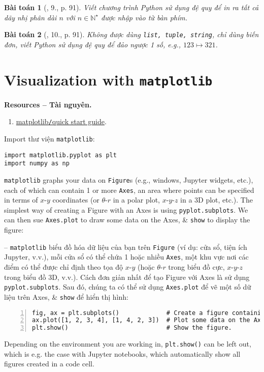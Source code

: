\documentclass{article}
\newtheorem{baitoan}{Bài toán}
\begin{document}
\begin{baitoan}[\cite{Que_BT_Python}, 9., p. 91]
    Viết chương trình Python sử dụng đệ quy để in ra tất cả dãy nhị phân dài $n$ với $n\in\mathbb{N}^\star$ được nhập vào từ bàn phím.
\end{baitoan}

\begin{baitoan}[\cite{Que_BT_Python}, 10., p. 91]
    Không được dùng {\tt list, tuple, string}, chỉ dùng biến đơn, viết Python sử dụng đệ quy để đảo ngược 1 số, e.g., $123\mapsto321$.
\end{baitoan}


\section{Visualization with {\tt matplotlib}}
\textbf{\textsf{Resources -- Tài nguyên.}}
\begin{enumerate}
    \item \href{https://matplotlib.org/stable/users/explain/quick_start.html#quick-start}{matplotlib{\tt/}quick start guide}.
\end{enumerate}
Import thư viện {\tt matplotlib}:
\begin{verbatim}
import matplotlib.pyplot as plt
import numpy as np
\end{verbatim}
{\tt matplotlib} graphs your data on {\tt Figure}s (e.g., windows, Jupyter widgets, etc.), each of which can contain 1 or more {\tt Axes}, an area where points can be specified in terms of $x$-$y$ coordinates (or $\theta$-$r$ in a polar plot, $x$-$y$-$z$ in a 3D plot, etc.). The simplest way of creating a Figure with an Axes is using {\tt pyplot.subplots}. We can then sue {\tt Axes.plot} to draw some data on the Axes, \& {\tt show} to display the figure:

-- {\tt matplotlib} biểu đồ hóa dữ liệu của bạn trên {\tt Figure} (ví dụ: cửa sổ, tiện ích Jupyter, v.v.), mỗi cửa sổ có thể chứa 1 hoặc nhiều {\tt Axes}, một khu vực nơi các điểm có thể được chỉ định theo tọa độ $x$-$y$ (hoặc $\theta$-$r$ trong biểu đồ cực, $x$-$y$-$z$ trong biểu đồ 3D, v.v.). Cách đơn giản nhất để tạo Figure với Axes là sử dụng {\tt pyplot.subplots}. Sau đó, chúng ta có thể sử dụng {\tt Axes.plot} để vẽ một số dữ liệu trên Axes, \& {\tt show} để hiển thị hình:
\begin{Verbatim}[numbers=left,xleftmargin=5mm]
fig, ax = plt.subplots()             # Create a figure containing a single Axes.
ax.plot([1, 2, 3, 4], [1, 4, 2, 3])  # Plot some data on the Axes.
plt.show()                           # Show the figure.
\end{Verbatim}
Depending on the environment you are working in, {\tt plt.show()} can be left out, which is e.g. the case with Jupyter notebooks, which automatically show all figures created in a code cell.
\end{document}
